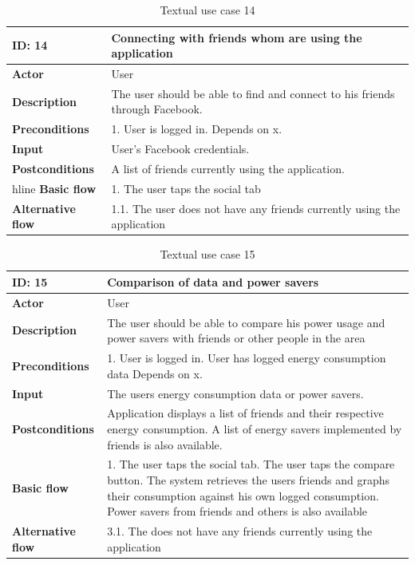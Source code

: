 \begin{table}[H]
\begin{tabular}{|l|p{11.7cm}|}
\hline
\textbf{ID: }14&\textbf{Connecting with friends whom are using the application}
\\\hline
\textbf{Actor} &User
\\\hline
\textbf{Description}&
The user should be able to find and connect to his friends through Facebook.\\\hline
\textbf{Preconditions}&
1. User is logged in.\newline
Depends on x.\\\hline
\textbf{Input}&
User's Facebook credentials.\\\hline
\textbf{Postconditions}& 
A list of friends currently using the application.\\hline
\textbf{Basic flow}&
1. The user taps the social tab
\\\hline
\textbf{Alternative flow}&
1.1. The user does not have any friends currently using the application
\\\hline
\end{tabular}
\caption{Textual use case 14}
\end{table}


\begin{table}[H]
\begin{tabular}{|l|p{11.7cm}|}
\hline
\textbf{ID: }15&\textbf{Comparison of data and power savers}
\\\hline
\textbf{Actor} &User
\\\hline
\textbf{Description}&
The user should be able to compare his power usage and power savers with friends or other people in the area\\\hline
\textbf{Preconditions}&
1. User is logged in\newline
2. User has logged energy consumption data\newline
Depends on x.\\\hline
\textbf{Input}&
The users energy consumption data or power savers.\\\hline
\textbf{Postconditions}& 
Application displays a list of friends and their respective energy consumption. A list of energy savers implemented by friends is also available. \\\hline
\textbf{Basic flow}&
1. The user taps the social tab\newline
2. The user taps the compare button\newline
3. The system retrieves the users friends and graphs their consumption against his own logged consumption\newline
4. Power savers from friends and others is also available
\\\hline
\textbf{Alternative flow}&
3.1. The does not have any friends currently using the application
\\\hline
\end{tabular}
\caption{Textual use case 15}
\end{table}